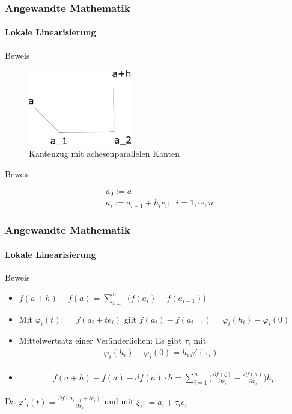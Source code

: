 \documentclass{beamer}
\begin{document}
\begin{frame}
    \frametitle{Angewandte Mathematik}
\framesubtitle{Lokale Linearisierung}
    \begin{block}{Beweis}
\begin{figure}[H]
      \centering
    \includegraphics[width=0.4\textwidth]{images/kantenzug}
      \caption{Kantenzug mit achesenparallelen Kanten}
\end{figure}

\end{block}
    \begin{block}{Beweis}

\begin{align*}
& a_0 := a \\
& a_i  := a_{i-1} + h_i e_i;  \;  \;  i = 1, \cdots , n
\end{align*} 
\end{block}

 \end{frame}




\begin{frame}
    \frametitle{Angewandte Mathematik}
\framesubtitle{Lokale Linearisierung}
    \begin{block}{Beweis}
\begin{itemize}
\item $f(a + h) - f(a) = \sum_{i=1}^{n} \bigl( f (a_i)   - f(a_{i-1})   \bigr)$
\pause \item  Mit $\varphi_i(t) : = f(a_i + t e_i)$ gilt  $f(a_i) - f(a_{i-1}) = \varphi_i(h_i)  - \varphi_i(0)$
\pause \item Mittelwertsatz einer Veränderlichen:  Es gibt  $\tau_i$  mit
\begin{align*}
\varphi_i(h_i)  - \varphi_i(0)  = h_i \varphi'(\tau_i) \;.
\end{align*}
\pause \item 
\begin{align*}
f(a + h) - f(a) - df(a) \cdot h = \sum_{i=1}^n  \biggl( \frac{\partial  f(\xi) }{\partial x_i} -    \frac{\partial  f(a) }{\partial x_i}   \biggr) h_i
\end{align*} 
\end {itemize}

 
Da $\varphi'_i(t) = \frac{\partial  f(a_{i-1} + t e_i ) }{\partial x_i}$ und mit $\xi_i: = a_i + \tau_i e_i$ 
\end{block}

 \end{frame}
\end{document}
